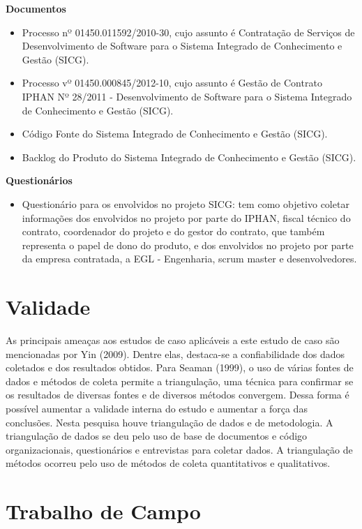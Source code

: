 \textbf{Documentos}
\begin{itemize}
\item Processo nº 01450.011592/2010-30, cujo assunto é Contratação de Serviços de Desenvolvimento de Software para o Sistema Integrado de Conhecimento e Gestão (SICG). 
\item Processo vº 01450.000845/2012-10, cujo assunto é Gestão de Contrato IPHAN Nº 28/2011 - Desenvolvimento de Software para o Sistema Integrado de Conhecimento e Gestão (SICG). 
\item Código Fonte do Sistema Integrado de Conhecimento e Gestão (SICG).
\item Backlog do Produto do Sistema Integrado de Conhecimento e Gestão (SICG).
\end{itemize}

\textbf{Questionários}
\begin{itemize}
\item Questionário para os envolvidos no projeto SICG: tem como objetivo coletar informações dos envolvidos no projeto por parte do IPHAN,  fiscal técnico do contrato, coordenador do projeto e do gestor do contrato, que também representa o papel de dono do produto, e dos envolvidos no projeto por parte da empresa contratada, a EGL - Engenharia, scrum master e desenvolvedores.
\end{itemize}

\section[Validade]{Validade}

As principais ameaças aos estudos de caso aplicáveis a este estudo de caso
são mencionadas por Yin (2009). Dentre elas, destaca-se a confiabilidade dos dados
coletados e dos resultados obtidos. Para Seaman (1999), o uso de várias fontes de dados
e métodos de coleta permite a triangulação, uma técnica para confirmar se os resultados
de diversas fontes e de diversos métodos convergem. Dessa forma é possível aumentar a
validade interna do estudo e aumentar a força das conclusões. Nesta pesquisa houve
triangulação de dados  e de metodologia. A triangulação de dados se deu
pelo uso de base de documentos e código organizacionais, questionários e entrevistas para coletar dados. A triangulação
de métodos ocorreu pelo uso de métodos de coleta quantitativos e qualitativos.


\section[Trabalho de Campo]{Trabalho de Campo}

